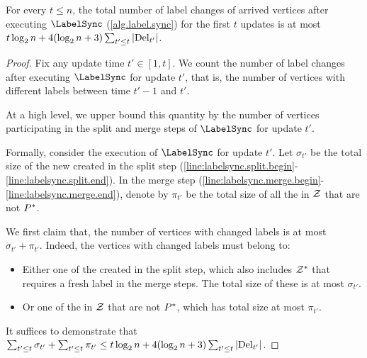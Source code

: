 \begin{lemma}\label{lem:number.of.updated.vertices}
    For every $ t\leq n $, the total number of label changes of arrived vertices after executing $ \LabelSync $ (\cref{alg.label.sync}) for the first $ t $ updates is at most $ t\log_{2}n + 4(\log_{2}n + 3)\sum_{t'\leq t} \left\lvert \mathrm{Del}_{t'} \right \rvert $.
\end{lemma}
\newcommand{\newpiecesize}[1]{\sigma_{#1}}
\newcommand{\smallpiecesize}[1]{\pi_{#1}}
\newcommand{\potential}[1]{\mathrm{Budget}(#1)}
\begin{proof}
    Fix any update time $ t'\in [1,t] $.
    We count the number of label changes after executing $ \LabelSync $ for update $ t' $, that is, the number of vertices with different labels between time $ t'-1 $ and $ t' $.

    At a high level, we upper bound this quantity by the number of vertices participating in the split and merge steps of $ \LabelSync $ for update $ t' $.

    Formally, consider the execution of $ \LabelSync $ for update $ t' $.
    Let $ \newpiecesize{t'} $ be the total size of the new  created in the split step (\cref{line:labelsync.split.begin}-\cref{line:labelsync.split.end}). 
    In the merge step (\cref{line:labelsync.merge.begin}-\cref{line:labelsync.merge.end}), denote by $ \smallpiecesize{t'} $ be the total size of all the  in $ \mathcal{Z} $ that are not $ P^* $.

    We first claim that, the number of vertices with changed labels is at most $ \newpiecesize{t'} + \smallpiecesize{t'} $. Indeed, the vertices with changed labels must belong to:
    \begin{itemize}
        \item Either one of the  created in the split step, which also includes  $ \mathcal{Z}^{*} $ that requires a fresh label in the merge steps. The total size of these  is at most $ \newpiecesize{t'} $.
        \item Or one of the  in $ \mathcal{Z} $ that are not $ P^* $, which has total size at most $ \smallpiecesize{t'} $.
    \end{itemize}

    It suffices to demonstrate that $ \sum_{t'\leq t} \newpiecesize{t'} + \sum_{t'\leq t}\smallpiecesize{t'} \leq t \log_{2}n + 4(\log_{2} n + 3) \sum_{t'\leq t}\card{\delt{t'}} $.


\end{proof}
